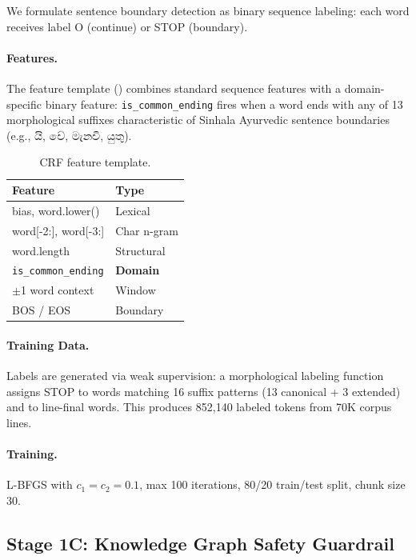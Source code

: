 \documentclass[11pt,a4paper]{article}
\begin{document}
We formulate sentence boundary detection as binary sequence labeling: each word receives label O (continue) or STOP (boundary).

\paragraph{Features.} The feature template () combines standard sequence features with a domain-specific binary feature: \texttt{is\_common\_ending} fires when a word ends with any of 13 morphological suffixes characteristic of Sinhala Ayurvedic sentence boundaries (e.g., යි, වේ, මැනවි, යුතු).

\begin{table}[t]
\small
\centering
\caption{CRF feature template.}
\label{tab:features}
\begin{tabular}{ll}
\toprule
\textbf{Feature} & \textbf{Type} \\
\midrule
bias, word.lower() & Lexical \\
word[-2:], word[-3:] & Char n-gram \\
word.length & Structural \\
\texttt{is\_common\_ending} & \textbf{Domain} \\
$\pm$1 word context & Window \\
BOS / EOS & Boundary \\
\bottomrule
\end{tabular}
\end{table}

\paragraph{Training Data.} Labels are generated via weak supervision: a morphological labeling function assigns STOP to words matching 16 suffix patterns (13 canonical + 3 extended) and to line-final words. This produces 852,140 labeled tokens from 70K corpus lines.

\paragraph{Training.} L-BFGS with $c_1=c_2=0.1$, max 100 iterations, 80/20 train/test split, chunk size 30.

\subsection{Stage 1C: Knowledge Graph Safety Guardrail}
\end{document}
